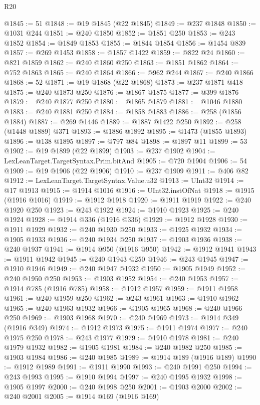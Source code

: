 \begin{lexlean}{R20}
\begin{coremodule}
{@1845 := 51
@1848 := @19 @1845 (@22 @1845)
@1849 := @237 @1848
@1850 := @1031 @244
@1851 := @240 @1850
@1852 := @1851 @250
@1853 := @243 @1852
@1854 := @1849 @1853
@1855 := @1844 @1854
@1856 := @1454 @839
@1857 := @269 @1453
@1858 := @1857 @1422
@1859 := @822 @24
@1860 := @821 @1859
@1862 := @240 @1860 @250
@1863 := @1851 @1862
@1864 := @752 @1863
@1865 := @240 @1864
@1866 := @962 @244
@1867 := @240 @1866
@1868 := 52
@1871 := @19 @1868 (@22 @1868)
@1873 := @237 @1871 @418
@1875 := @240 @1873 @250
@1876 := @1867 @1875
@1877 := @399 @1876
@1879 := @240 @1877 @250
@1880 := @1865 @1879
@1881 := @1046 @1880
@1883 := @240 @1881 @250
@1884 := @1858 @1883
@1886 := @258 (@1856 @1884)
@1887 := @269 @1446
@1889 := @1887 @1422 @250
@1892 := @258 (@1448 @1889) @371
@1893 := @1886 @1892
@1895 := @1473 (@1855 @1893)
@1896 := @138 @1895
@1897 := @797 @84
@1898 := @1897 @11
@1899 := 53
@1902 := @19 @1899 (@22 @1899)
@1903 := @237 @1902
@1904 := LexLeanTarget.TargetSyntax.Prim.bitAnd
@1905 := @720 @1904
@1906 := 54
@1909 := @19 @1906 (@22 @1906)
@1910 := @237 @1909
@1911 := @406 @82
@1912 := LexLeanTarget.TargetSyntax.Value.u32
@1913 := UInt32
@1914 := @17 @1913
@1915 := @1914 @1016
@1916 := UInt32.instOfNat
@1918 := @1915 (@1916 @1016)
@1919 := @1912 @1918
@1920 := @1911 @1919
@1922 := @240 @1920 @250
@1923 := @243 @1922
@1924 := @1910 @1923
@1925 := @240 @1924
@1928 := @1914 @336 (@1916 @336)
@1929 := @1912 @1928
@1930 := @1911 @1929
@1932 := @240 @1930 @250
@1933 := @1925 @1932
@1934 := @1905 @1933
@1936 := @240 @1934 @250
@1937 := @1903 @1936
@1938 := @240 @1937
@1941 := @1914 @950 (@1916 @950)
@1942 := @1912 @1941
@1943 := @1911 @1942
@1945 := @240 @1943 @250
@1946 := @243 @1945
@1947 := @1910 @1946
@1949 := @240 @1947 @1932
@1950 := @1905 @1949
@1952 := @240 @1950 @250
@1953 := @1903 @1952
@1954 := @240 @1953
@1957 := @1914 @785 (@1916 @785)
@1958 := @1912 @1957
@1959 := @1911 @1958
@1961 := @240 @1959 @250
@1962 := @243 @1961
@1963 := @1910 @1962
@1965 := @240 @1963 @1932
@1966 := @1905 @1965
@1968 := @240 @1966 @250
@1969 := @1903 @1968
@1970 := @240 @1969
@1973 := @1914 @349 (@1916 @349)
@1974 := @1912 @1973
@1975 := @1911 @1974
@1977 := @240 @1975 @250
@1978 := @243 @1977
@1979 := @1910 @1978
@1981 := @240 @1979 @1932
@1982 := @1905 @1981
@1984 := @240 @1982 @250
@1985 := @1903 @1984
@1986 := @240 @1985
@1989 := @1914 @189 (@1916 @189)
@1990 := @1912 @1989
@1991 := @1911 @1990
@1993 := @240 @1991 @250
@1994 := @243 @1993
@1995 := @1910 @1994
@1997 := @240 @1995 @1932
@1998 := @1905 @1997
@2000 := @240 @1998 @250
@2001 := @1903 @2000
@2002 := @240 @2001
@2005 := @1914 @169 (@1916 @169)
}
\end{coremodule}
\end{lexlean}
